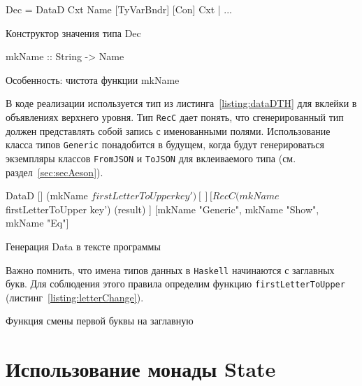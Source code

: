 \begin{ListingEnv}[H]
\begin{Verb}
Dec 
   = DataD Cxt Name [TyVarBndr] [Con] Cxt
   | ...
\end{Verb}
\caption{Конструктор значения типа Dec}
\label{listing:dataDTH}
\end{ListingEnv} 

\begin{ListingEnv}[H]
\begin{Verb}
mkName :: String -> Name
\end{Verb}
\caption{Особенность: чистота функции mkName}
\label{listing:mkName}
\end{ListingEnv} 

В коде реализации используется тип из листинга~\ref{listing:dataDTH} для вклейки в объявлениях верхнего уровня. Тип \lstinline{RecC} дает понять, что сгенерированный тип должен представлять собой запись с именованными полями. Использование класса типов \lstinline{Generic} понадобится в будущем, когда будут генерироваться экземпляры классов \lstinline{FromJSON} и \lstinline{ToJSON} для вклеиваемого типа (см. раздел~\ref{sec:secAeson}).

\begin{ListingEnv}[H]
\begin{Verb}
DataD
     []
     (mkName $ firstLetterToUpper key')
     []
     [ RecC (mkName $ firstLetterToUpper key')  (result) ]
     [mkName "Generic", mkName "Show", mkName "Eq"]
\end{Verb}
\caption{Генерация Data в тексте программы}
\label{listing:dataDTHjson}
\end{ListingEnv} 

Важно помнить, что имена типов данных в \lstinline{Haskell} начинаются с заглавных букв. Для соблюдения этого правила определим функцию \lstinline{firstLetterToUpper} (листинг~\ref{listing:letterChange}).

\begin{ListingEnv}[H]
\caption{Функция смены первой буквы на заглавную}
\label{listing:letterChange}
\end{ListingEnv} 

\section{Использование монады State}

